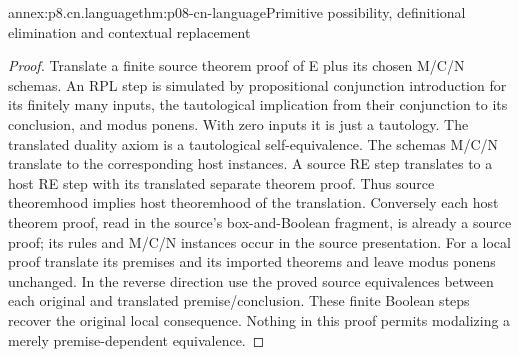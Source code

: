 \begin{annexitem}{annex:p8.cn.language}{thm:p08-cn-language}{Primitive possibility, definitional elimination and contextual replacement}
\begin{proof}
Translate a finite source theorem proof of E plus its chosen M/C/N
schemas. An RPL step is simulated by propositional conjunction
introduction for its finitely many inputs, the tautological implication
from their conjunction to its conclusion, and modus ponens. With
zero inputs it is just a tautology. The translated duality axiom
is a tautological self-equivalence. The
schemas M/C/N translate to the corresponding host instances. A source
RE step translates to a host RE step with its translated separate
theorem proof. Thus source theoremhood implies host theoremhood of
the translation. Conversely each host theorem proof, read in the
source's box-and-Boolean fragment, is already a source proof; its
rules and M/C/N instances occur in the source presentation.
For a local proof translate its premises and its imported theorems
and leave modus ponens unchanged. In the reverse direction use the
proved source equivalences between each original and translated
premise/conclusion. These finite Boolean steps recover the original
local consequence. Nothing in this proof permits modalizing a
merely premise-dependent equivalence.
\end{proof}
\end{annexitem}

